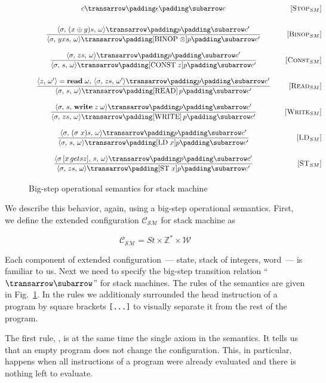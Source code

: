 \begin{figure}[t]
  \[
  \def\arraystretch{3}
  \arraycolsep=10pt
  \def\arraystretch{3}
  \begin{array}{cr} 
  \trans{c}{\epsilon}{c}&\ruleno{Stop$_{SM}$}\\
  \trule{\trans{\inbr{\sigma,\,(x\oplus y)s,\,\omega}}{p}{c^\prime}}{\trans{\inbr{\sigma,\,yxs,\,\omega}}{[\llang{BINOP $\;\otimes$}]p}{c^\prime}}&\ruleno{Binop$_{SM}$}\\
  \trule{\trans{\inbr{\sigma,\,zs,\,\omega}}{p}{c^\prime}}{\trans{\inbr{\sigma,\,s,\,\omega}}{[\llang{CONST $\;z$}]p}{c^\prime}}&\ruleno{Const$_{SM}$}\\
  \trule{\inbr{z,\,\omega^\prime}=\primi{read}{\;\omega},\,\trans{\inbr{\sigma,\,zs,\,\omega^\prime}}{p}{c^\prime}}{\trans{\inbr{\sigma,\,s,\,\omega}}{[\llang{READ}]\,p}{c^\prime}}&\ruleno{Read$_{SM}$}\\
  \trule{\trans{\inbr{\sigma,\,s,\,\primi{write}{\;z\;\omega}}}{p}{c^\prime}}{\trans{\inbr{\sigma,\,zs,\,\omega}}{[\llang{WRITE}]\,p}{c^\prime}}&\ruleno{Write$_{SM}$}\\
  \trule{\trans{\inbr{\sigma,\,(\sigma\;x)s,\,\omega}}{p}{c^\prime}}{\trans{\inbr{\sigma,\,s,\,\omega}}{[\llang{LD $\;x$}]p}{c^\prime}}&\ruleno{LD$_{SM}$}\\
  \trule{\trans{\inbr{\sigma\,[x\,gets z],\,s,\,\omega}}{p}{c^\prime}}{\trans{\inbr{\sigma,\,zs,\,\omega}}{[\llang{ST $\;x$}]p}{c^\prime}}&\ruleno{ST$_{SM}$}
  \end{array}
  \]
  \caption{Big-step operational semantics for stack machine}
  \label{sm-bigstep}
\end{figure}

We describe this behavior, again, using a big-step operational semantics. First, we define the extended configuration $\mathscr{C}_{\mathscr{SM}}$
for stack machine as

\[
\mathscr{C}_{\mathscr{SM}}=St\times\mathbb{Z}^*\times\mathscr{W}
\]


Each component of extended configuration~--- state, stack of integers, word~--- is familiar to us. Next we need
to specify the big-step transition relation \mbox{``$\transrel$''} for stack machines. The rules of the semantics
are given in Fig.~\ref{sm-bigstep}. In the rules we additionaly surrounded the head instruction of a program
by square brackets \lstinline|[...]| to visually separate it from the rest of the program.

The first rule, , is at the same time the single axiom in the semantics. It tells us that an empty
program does not change the configuration. This, in particular, happens when all instructions of a program were
already evaluated and there is nothing left to evaluate.

